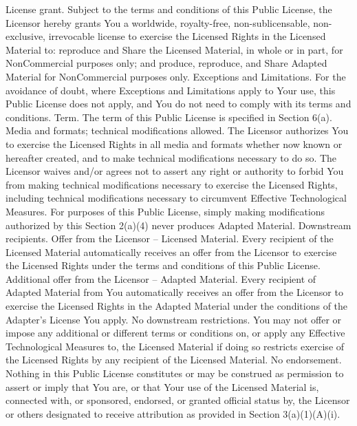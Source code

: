     License grant.
        Subject to the terms and conditions of this Public License, the Licensor hereby grants You a worldwide, royalty-free, non-sublicensable, non-exclusive, irrevocable license to exercise the Licensed Rights in the Licensed Material to:
            reproduce and Share the Licensed Material, in whole or in part, for NonCommercial purposes only; and
            produce, reproduce, and Share Adapted Material for NonCommercial purposes only.
        Exceptions and Limitations. For the avoidance of doubt, where Exceptions and Limitations apply to Your use, this Public License does not apply, and You do not need to comply with its terms and conditions.
        Term. The term of this Public License is specified in Section 6(a).
        Media and formats; technical modifications allowed. The Licensor authorizes You to exercise the Licensed Rights in all media and formats whether now known or hereafter created, and to make technical modifications necessary to do so. The Licensor waives and/or agrees not to assert any right or authority to forbid You from making technical modifications necessary to exercise the Licensed Rights, including technical modifications necessary to circumvent Effective Technological Measures. For purposes of this Public License, simply making modifications authorized by this Section 2(a)(4) never produces Adapted Material.
        Downstream recipients.
            Offer from the Licensor – Licensed Material. Every recipient of the Licensed Material automatically receives an offer from the Licensor to exercise the Licensed Rights under the terms and conditions of this Public License.
            Additional offer from the Licensor – Adapted Material. Every recipient of Adapted Material from You automatically receives an offer from the Licensor to exercise the Licensed Rights in the Adapted Material under the conditions of the Adapter’s License You apply.
            No downstream restrictions. You may not offer or impose any additional or different terms or conditions on, or apply any Effective Technological Measures to, the Licensed Material if doing so restricts exercise of the Licensed Rights by any recipient of the Licensed Material.
        No endorsement. Nothing in this Public License constitutes or may be construed as permission to assert or imply that You are, or that Your use of the Licensed Material is, connected with, or sponsored, endorsed, or granted official status by, the Licensor or others designated to receive attribution as provided in Section 3(a)(1)(A)(i).


